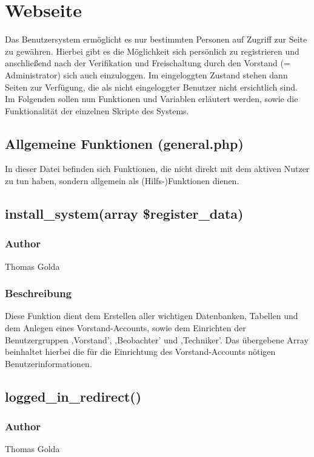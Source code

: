 \documentclass[fontsize = 12pt, paper = a4]{scrreprt}
\begin{document}

\newpage

\section{Webseite}
Das Benutzersystem ermöglicht es nur bestimmten Personen auf Zugriff zur Seite zu gewähren. Hierbei gibt es die Möglichkeit sich persönlich zu registrieren und anschließend nach der Verifikation und Freischaltung durch den Vorstand (= Administrator) sich auch einzuloggen. Im eingeloggten Zustand stehen dann Seiten zur Verfügung, die als nicht eingeloggter Benutzer nicht ersichtlich sind.\\

Im Folgenden sollen nun Funktionen und Variablen erläutert werden, sowie die Funktionalität der einzelnen Skripte des Systems.

\subsection{Allgemeine Funktionen (general.php)}
In dieser Datei befinden sich Funktionen, die nicht direkt mit dem aktiven Nutzer zu tun haben, sondern allgemein als (Hilfs-)Funktionen dienen.
\subsection*{install\_system(array \$register\_data)}
\subsubsection*{Author}
Thomas Golda
\subsubsection*{Beschreibung}
Diese Funktion dient dem Erstellen aller wichtigen Datenbanken, Tabellen und dem Anlegen eines Vorstand-Accounts, sowie dem Einrichten der Benutzergruppen ,Vorstand', ,Beobachter' und ,Techniker'. Das übergebene Array beinhaltet hierbei die für die Einrichtung des Vorstand-Accounts nötigen Benutzerinformationen.


\subsection*{logged\_in\_redirect()}
\subsubsection*{Author}
Thomas Golda
\end{document}
